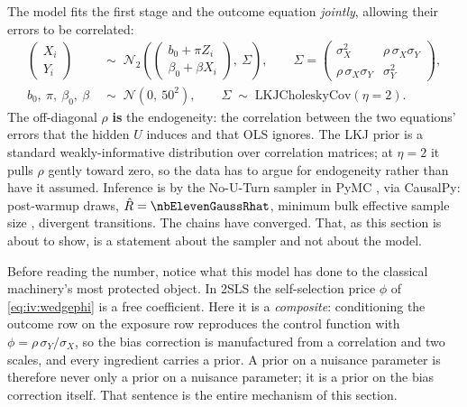 The model fits the first stage and the outcome equation \emph{jointly}, allowing their errors to be
correlated:
%
\begin{align}
  \begin{pmatrix} X_i \\ Y_i \end{pmatrix} &\;\sim\;
    \mathcal N_2\!\left(
      \begin{pmatrix} b_0 + \pi Z_i \\ \beta_0 + \beta X_i \end{pmatrix},\ \Sigma \right),
    \qquad
    \Sigma = \begin{pmatrix}
       \sigma_X^{2} & \rho\,\sigma_X\sigma_Y \\
       \rho\,\sigma_X\sigma_Y & \sigma_Y^{2} \end{pmatrix},
    \label{eq:iv:joint}\\
  b_0,\ \pi,\ \beta_0,\ \beta &\;\sim\; \mathcal N\!\left(0,\ 50^{2}\right),
    \qquad
  \Sigma \;\sim\; \text{LKJCholeskyCov}(\eta = 2).
    \label{eq:iv:priors}
\end{align}
%
The off-diagonal $\rho$ \textbf{is} the endogeneity: the correlation between the two equations'
errors that the hidden $U$ induces and that OLS ignores. The LKJ prior \citep{lkj2009} is a
standard weakly-informative distribution over correlation matrices; at $\eta = 2$ it pulls $\rho$
gently toward zero, so the data has to argue for endogeneity rather than have it assumed. Inference
is by the No-U-Turn sampler \citep{hoffman2014} in PyMC \citep{salvatier2016}, via CausalPy:
\nbElevenGaussNDraws{} post-warmup draws, $\hat R = \nbElevenGaussRhat$, minimum bulk effective
sample size \nbElevenGaussEss{} \citep{vehtari2021}, \nbElevenGaussDivergences{} divergent
transitions. The chains have converged. That, as this section is about to show, is a statement
about the sampler and not about the model.

Before reading the number, notice what this model has done to the classical machinery's most
protected object. In 2SLS the self-selection price $\phi$ of \cref{eq:iv:wedgephi} is a free
coefficient. Here it is a \emph{composite}: conditioning the outcome row on the exposure row
reproduces the control function with $\phi = \rho\,\sigma_Y/\sigma_X$, so the bias correction
is manufactured from a correlation and two scales, and every ingredient carries a prior. A
prior on a nuisance parameter is therefore never only a prior on a nuisance parameter; it is a
prior on the bias correction itself. That sentence is the entire mechanism of this section.

